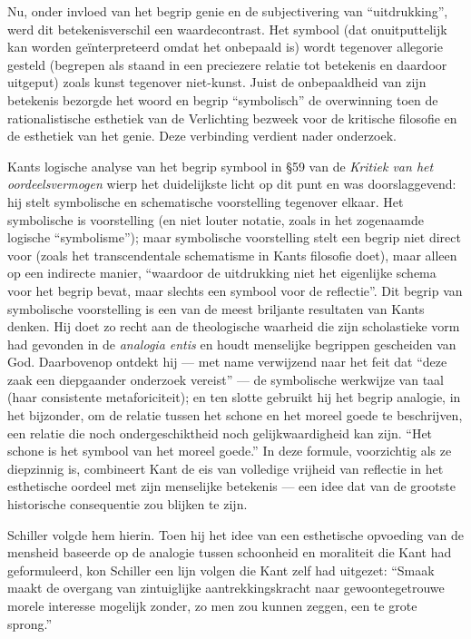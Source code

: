 Nu, onder invloed van het begrip genie en de subjectivering van ``uitdrukking'', werd dit betekenisverschil een waardecontrast. Het symbool (dat onuitputtelijk kan worden geïnterpreteerd omdat het onbepaald is) wordt tegenover allegorie gesteld (begrepen als staand in een preciezere relatie tot betekenis en daardoor uitgeput) zoals kunst tegenover niet-kunst. Juist de onbepaaldheid van zijn betekenis bezorgde het woord en begrip ``symbolisch'' de overwinning toen de rationalistische esthetiek van de Verlichting bezweek voor de kritische filosofie en de esthetiek van het genie. Deze verbinding verdient nader onderzoek.

Kants logische analyse van het begrip symbool in §59 van de \textit{Kritiek van het oordeelsvermogen} wierp het duidelijkste licht op dit punt en was doorslaggevend: hij stelt symbolische en schematische voorstelling tegenover elkaar. Het symbolische is voorstelling (en niet louter notatie, zoals in het zogenaamde logische ``symbolisme''); maar symbolische voorstelling stelt een begrip niet direct voor (zoals het transcendentale schematisme in Kants filosofie doet), maar alleen op een indirecte manier, ``waardoor de uitdrukking niet het eigenlijke schema voor het begrip bevat, maar slechts een symbool voor de reflectie''. Dit begrip van symbolische voorstelling is een van de meest briljante resultaten van Kants denken. Hij doet zo recht aan de theologische waarheid die zijn scholastieke vorm had gevonden in de \textit{analogia entis} en houdt menselijke begrippen gescheiden van God. Daarbovenop ontdekt hij — met name verwijzend naar het feit dat ``deze zaak een diepgaander onderzoek vereist'' — de symbolische werkwijze van taal (haar consistente metaforiciteit); en ten slotte gebruikt hij het begrip analogie, in het bijzonder, om de relatie tussen het schone en het moreel goede te beschrijven, een relatie die noch ondergeschiktheid noch gelijkwaardigheid kan zijn. ``Het schone is het symbool van het moreel goede.'' In deze formule, voorzichtig als ze diepzinnig is, combineert Kant de eis van volledige vrijheid van reflectie in het esthetische oordeel met zijn menselijke betekenis — een idee dat van de grootste historische consequentie zou blijken te zijn.

Schiller volgde hem hierin. Toen hij het idee van een esthetische opvoe\-ding van de mensheid baseerde op de analogie tussen schoonheid en moraliteit die Kant had geformuleerd, kon Schiller een lijn volgen die Kant zelf had uitgezet: ``Smaak maakt de overgang van zintuiglijke aantrekkingskracht naar gewoontegetrouwe morele interesse mogelijk zonder, zo men zou kunnen zeggen, een te grote sprong.''

